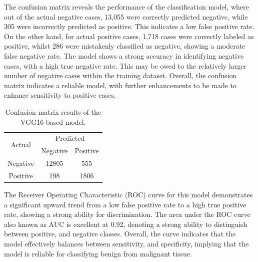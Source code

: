 \documentclass[../main]{subfiles}
\begin{document}
\noindent The confusion matrix reveals the performance of the classification model, where out of the actual negative cases, 13,055 were correctly predicted negative, while 305 were incorrectly predicted as positive. This indicates a low false positive rate. On the other hand, for actual positive cases, 1,718 cases were correctly labeled as positive, whilst 286 were mistakenly classified as negative, showing a moderate false negative rate. The model shows a strong accuracy in identifying negative cases, with a high true negative rate. This may be owed to the relatively larger number of negative cases within the training dataset. Overall, the confusion matrix indicates a reliable model, with further enhancements to be made to enhance sensitivity to positive cases.

\begin{table}[h]
    \centering
    \begin{tabular}{|c|c|c|}
        \hline
        \multirow{2}{*}{Actual} & \multicolumn{2}{c|}{Predicted} \\ \cline{2-3}
                                & Negative         & Positive         \\ \hline
        Negative                & 12805            & 555              \\ \hline
        Positive                & 198              & 1806              \\ \hline
    \end{tabular}
    \caption{Confusion matrix results of the VGG16-based model.}
    \label{tab:confusion-matrix-vgg16}
\end{table}

\noindent The Receiver Operating Characteristic (ROC) curve for this model demonstrates a significant upward trend from a low false positive rate to a high true positive rate, showing a strong ability for discrimination. The area under the ROC curve also known as AUC is excellent at 0.92, denoting a strong ability to distinguish between positive, and negative classes. Overall, the curve indicates that the model effectively balances between sensitivity, and specificity, implying that the model is reliable for classifying benign from malignant tissue.
\end{document}

